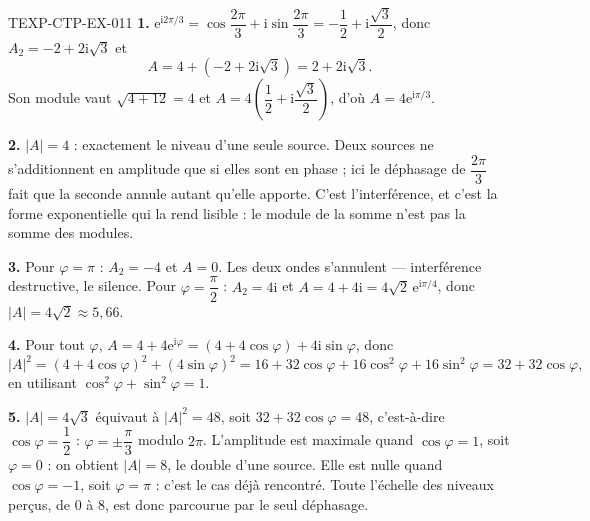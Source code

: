 \begin{corrige}{TEXP-CTP-EX-011}
\textbf{1.} $\mathrm{e}^{\mathrm{i}2\pi/3}=\cos\dfrac{2\pi}{3}+\mathrm{i}\sin\dfrac{2\pi}{3}
=-\dfrac12+\mathrm{i}\dfrac{\sqrt3}{2}$, donc $A_2=-2+2\mathrm{i}\sqrt3$ et
\[
  A=4+(-2+2\mathrm{i}\sqrt3)=2+2\mathrm{i}\sqrt3.
\]
Son module vaut $\sqrt{4+12}=4$ et $A=4\left(\dfrac12+\mathrm{i}\dfrac{\sqrt3}{2}\right)$,
d'où $A=4\mathrm{e}^{\mathrm{i}\pi/3}$.

\textbf{2.} $|A|=4$ : exactement le niveau d'une seule source. Deux sources ne
s'additionnent en amplitude que si elles sont en phase ; ici le déphasage de
$\dfrac{2\pi}{3}$ fait que la seconde annule autant qu'elle apporte. C'est
l'interférence, et c'est la forme exponentielle qui la rend lisible : le module
de la somme n'est pas la somme des modules.

\textbf{3.} Pour $\varphi=\pi$ : $A_2=-4$ et $A=0$. Les deux ondes s'annulent —
interférence destructive, le silence. Pour $\varphi=\dfrac{\pi}{2}$ :
$A_2=4\mathrm{i}$ et $A=4+4\mathrm{i}=4\sqrt2\,\mathrm{e}^{\mathrm{i}\pi/4}$, donc
$|A|=4\sqrt2\approx 5{,}66$.

\textbf{4.} Pour tout $\varphi$,
$A=4+4\mathrm{e}^{\mathrm{i}\varphi}=(4+4\cos\varphi)+4\mathrm{i}\sin\varphi$, donc
\[
  |A|^2=(4+4\cos\varphi)^2+(4\sin\varphi)^2
  =16+32\cos\varphi+16\cos^2\varphi+16\sin^2\varphi
  =32+32\cos\varphi,
\]
en utilisant $\cos^2\varphi+\sin^2\varphi=1$.

\textbf{5.} $|A|=4\sqrt3$ équivaut à $|A|^2=48$, soit $32+32\cos\varphi=48$,
c'est-à-dire $\cos\varphi=\dfrac12$ : $\varphi=\pm\dfrac{\pi}{3}$ modulo $2\pi$.
L'amplitude est maximale quand $\cos\varphi=1$, soit $\varphi=0$ : on obtient
$|A|=8$, le double d'une source. Elle est nulle quand $\cos\varphi=-1$, soit
$\varphi=\pi$ : c'est le cas déjà rencontré. Toute l'échelle des niveaux
perçus, de $0$ à $8$, est donc parcourue par le seul déphasage.
\end{corrige}
